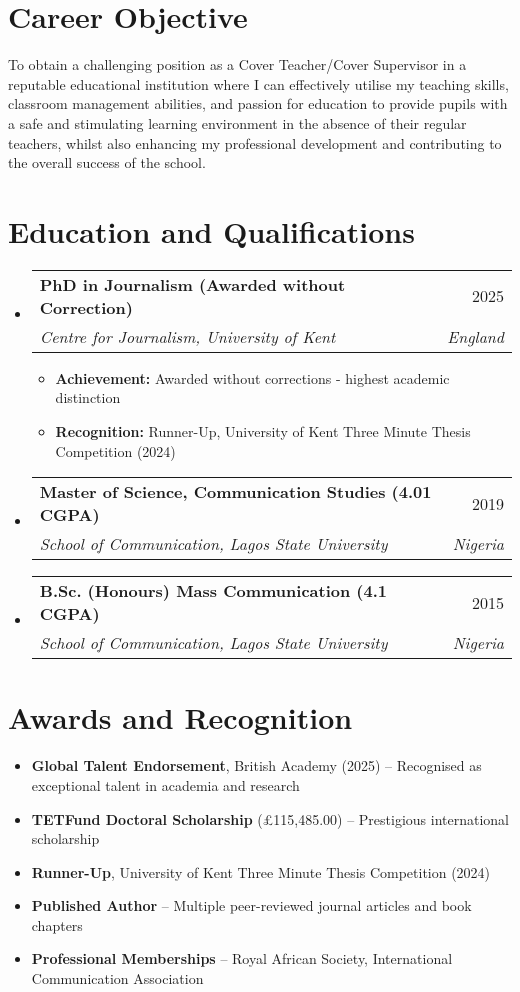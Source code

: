 \documentclass[a4paper,11pt]{article}
\makeatletter
\newcommand{\resumeItem}[1]{
  \item\small{
    {#1 \vspace{-2pt}}
  }
}
\newcommand{\resumeSubheading}[4]{
  \vspace{-2pt}\item
    \begin{tabular*}{0.97\textwidth}[t]{l@{\extracolsep{\fill}}r}
      \textbf{#1} & #2 \\
      \textit{\small#3} & \textit{\small #4} \\
    \end{tabular*}\vspace{-7pt}
}
\newcommand{\resumeSubHeadingListStart}{\begin{itemize}[leftmargin=0.15in, label={}]}
\newcommand{\resumeSubHeadingListEnd}{\end{itemize}}
\newcommand{\resumeItemListStart}{\begin{itemize}}
\newcommand{\resumeItemListEnd}{\end{itemize}\vspace{-5pt}}
\makeatother
\begin{document}
\section{Career Objective}
To obtain a challenging position as a Cover Teacher/Cover Supervisor in a reputable educational institution where I can effectively utilise my teaching skills, classroom management abilities, and passion for education to provide pupils with a safe and stimulating learning environment in the absence of their regular teachers, whilst also enhancing my professional development and contributing to the overall success of the school.

\section{Education and Qualifications}
  \resumeSubHeadingListStart
    \resumeSubheading
      {PhD in Journalism (Awarded without Correction)}{2025}
      {Centre for Journalism, University of Kent}{England}
      \resumeItemListStart
        \resumeItem{\textbf{Achievement:} Awarded without corrections - highest academic distinction}
        \resumeItem{\textbf{Recognition:} Runner-Up, University of Kent Three Minute Thesis Competition (2024)}
      \resumeItemListEnd
    
    \resumeSubheading
      {Master of Science, Communication Studies (4.01 CGPA)}{2019}
      {School of Communication, Lagos State University}{Nigeria}
    
    \resumeSubheading
      {B.Sc. (Honours) Mass Communication (4.1 CGPA)}{2015}
      {School of Communication, Lagos State University}{Nigeria}
  \resumeSubHeadingListEnd

\section{Awards and Recognition}
    \resumeItemListStart
        \resumeItem{\textbf{Global Talent Endorsement}, British Academy (2025) -- Recognised as exceptional talent in academia and research}
        \resumeItem{\textbf{TETFund Doctoral Scholarship} (£115,485.00) -- Prestigious international scholarship}
        \resumeItem{\textbf{Runner-Up}, University of Kent Three Minute Thesis Competition (2024)}
        \resumeItem{\textbf{Published Author} -- Multiple peer-reviewed journal articles and book chapters}
        \resumeItem{\textbf{Professional Memberships} -- Royal African Society, International Communication Association}
    \resumeItemListEnd
\end{document}
